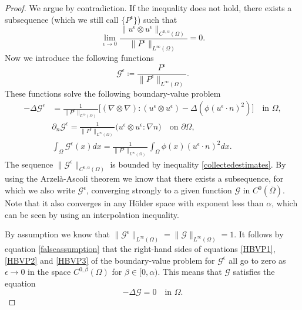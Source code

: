 \documentclass[12pt,a4paper]{article}
\theoremstyle{definition}
\theoremstyle{remark}
\numberwithin{equation}{section}
\begin{document}
\begin{proof}
We argue by contradiction. If the inequality does not hold, there exists a subsequence (which we still call $\{ P^\epsilon \}$) such that
\begin{equation} \label{falseassumption}
\lim_{\epsilon \rightarrow 0} \frac{\lVert u^\epsilon \otimes u^\epsilon \rVert_{C^{0, \alpha} (\Omega)}}{\lVert P^\epsilon \rVert_{L^\infty (\Omega)}} = 0.
\end{equation}
Now we introduce the following functions
\begin{equation*}
\mathcal{G}^\epsilon \coloneqq \frac{P^\epsilon}{\lVert P^\epsilon \rVert_{L^\infty (\Omega)}}.
\end{equation*}
These functions solve the following boundary-value problem
\begingroup
\allowdisplaybreaks
\begin{align}
- \Delta \mathcal{G}^\epsilon &= \frac{1}{\lVert P^\epsilon \rVert_{L^\infty  (\Omega)} } \bigg[ (\nabla \otimes \nabla ) : (u^\epsilon \otimes u^\epsilon) - \Delta ( \phi (u^\epsilon \cdot n)^2 ) \bigg] \quad \text{in } \Omega, \label{HBVP1} \\
&\partial_n \mathcal{G}^\epsilon = \frac{1}{\lVert P^\epsilon \rVert_{L^\infty (\Omega)}} \big( u^\epsilon \otimes u^\epsilon : \nabla n \big) \quad \text{on } \partial \Omega, \label{HBVP2} \\
&\int_\Omega \mathcal{G}^\epsilon (x) dx = \frac{1}{\lVert P^\epsilon \rVert_{L^\infty (\Omega)}} \int_\Omega \phi (x) (u^\epsilon \cdot n)^2 dx. \label{HBVP3}
\end{align}
\endgroup
The sequence $\lVert \mathcal{G}^\epsilon \rVert_{C^{0, \alpha} (\Omega)}$ is bounded by inequality \eqref{collectedestimates}. By using the Arzelà-Ascoli theorem we know that there exists a subsequence, for which we also write $\mathcal{G}^\epsilon$, converging strongly to a given function $\mathcal{G}$ in $C^0 (\overline{\Omega})$. Note that it also converges in any H\"older space with exponent less than $\alpha$, which can be seen by using an interpolation inequality.

By assumption we know that $\lVert \mathcal{G}^\epsilon \rVert_{L^\infty (\Omega)} = \lVert \mathcal{G} \rVert_{L^\infty (\Omega) } = 1$. It follows by equation \eqref{falseassumption} that the right-hand sides of equations \eqref{HBVP1}, \eqref{HBVP2} and \eqref{HBVP3} of the boundary-value problem for $\mathcal{G}^\epsilon$ all go to zero as $\epsilon \rightarrow 0$ in the space $C^{0, \beta} (\Omega)$ for $\beta \in [0, \alpha)$. This means that $\mathcal{G}$ satisfies the equation
\begin{equation*}
- \Delta \mathcal{G} = 0 \quad \text{in } \Omega.
\end{equation*}


\end{proof}
\end{document}
